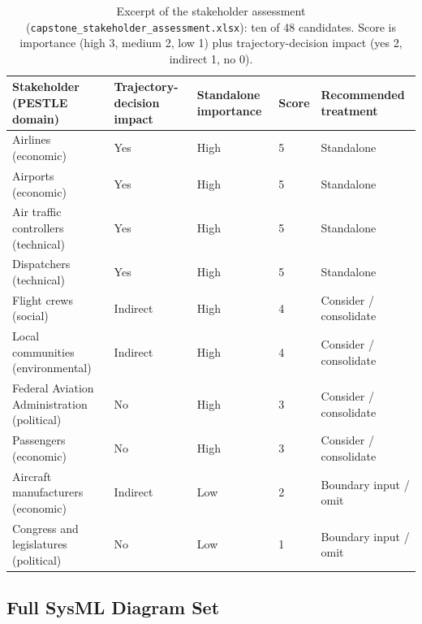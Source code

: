 \begin{table}[h]
\centering
\small
\caption{Excerpt of the stakeholder assessment (\texttt{capstone\_stakeholder\_assessment.xlsx}): ten of 48 candidates. Score is importance (high 3, medium 2, low 1) plus trajectory-decision impact (yes 2, indirect 1, no 0).}
\label{tab:stakeholder-assessment-excerpt}
\begin{tabular}{@{}p{4.6cm}p{2.6cm}p{2.2cm}p{1.0cm}p{4.2cm}@{}}
\toprule
Stakeholder (PESTLE domain) & Trajectory-decision impact & Standalone importance & Score & Recommended treatment \\
\midrule
Airlines (economic) & Yes & High & 5 & Standalone \\
Airports (economic) & Yes & High & 5 & Standalone \\
Air traffic controllers (technical) & Yes & High & 5 & Standalone \\
Dispatchers (technical) & Yes & High & 5 & Standalone \\
Flight crews (social) & Indirect & High & 4 & Consider / consolidate \\
Local communities (environmental) & Indirect & High & 4 & Consider / consolidate \\
Federal Aviation Administration (political) & No & High & 3 & Consider / consolidate \\
Passengers (economic) & No & High & 3 & Consider / consolidate \\
Aircraft manufacturers (economic) & Indirect & Low & 2 & Boundary input / omit \\
Congress and legislatures (political) & No & Low & 1 & Boundary input / omit \\
\bottomrule
\end{tabular}
\end{table}

\subsection{Full SysML Diagram Set}
\label{app:architecture}

